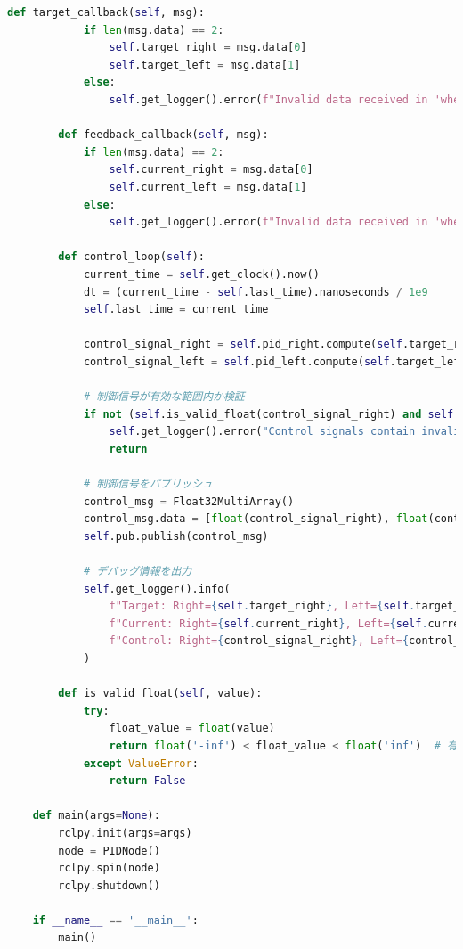 \begin{lstlisting}[language=Python, caption=PID\_node.py]
        def target_callback(self, msg):
            if len(msg.data) == 2:
                self.target_right = msg.data[0]
                self.target_left = msg.data[1]
            else:
                self.get_logger().error(f"Invalid data received in 'wheel_targets'. Expected 2 floats, got {len(msg.data)}")
    
        def feedback_callback(self, msg):
            if len(msg.data) == 2:
                self.current_right = msg.data[0]
                self.current_left = msg.data[1]
            else:
                self.get_logger().error(f"Invalid data received in 'wheel_feedback'. Expected 2 floats, got {len(msg.data)}")
    
        def control_loop(self):
            current_time = self.get_clock().now()
            dt = (current_time - self.last_time).nanoseconds / 1e9
            self.last_time = current_time
    
            control_signal_right = self.pid_right.compute(self.target_right, self.current_right, dt)
            control_signal_left = self.pid_left.compute(self.target_left, self.current_left, dt)
    
            # 制御信号が有効な範囲内か検証
            if not (self.is_valid_float(control_signal_right) and self.is_valid_float(control_signal_left)):
                self.get_logger().error("Control signals contain invalid values. Skipping this loop.")
                return
    
            # 制御信号をパブリッシュ
            control_msg = Float32MultiArray()
            control_msg.data = [float(control_signal_right), float(control_signal_left)]
            self.pub.publish(control_msg)
    
            # デバッグ情報を出力
            self.get_logger().info(
                f"Target: Right={self.target_right}, Left={self.target_left} | "
                f"Current: Right={self.current_right}, Left={self.current_left} | "
                f"Control: Right={control_signal_right}, Left={control_signal_left}"
            )
    
        def is_valid_float(self, value):
            try:
                float_value = float(value)
                return float('-inf') < float_value < float('inf')  # 有限数の検証
            except ValueError:
                return False
    
    def main(args=None):
        rclpy.init(args=args)
        node = PIDNode()
        rclpy.spin(node)
        rclpy.shutdown()
    
    if __name__ == '__main__':
        main()
\end{lstlisting}

